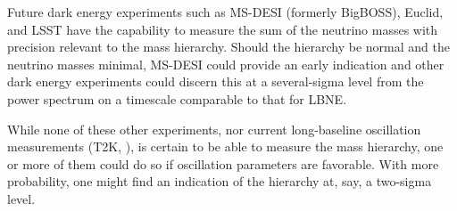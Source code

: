Future dark energy experiments such as MS-DESI (formerly BigBOSS),
Euclid, and LSST have the capability to measure the sum of the neutrino masses with precision relevant to the mass hierarchy.  Should the hierarchy be normal and the neutrino masses minimal, MS-DESI could provide an early indication and other dark energy experiments could discern this at a several-sigma level from the power spectrum on a timescale comparable to that for LBNE.

While none of these other experiments, nor current long-baseline oscillation measurements (T2K, \NOvA), is certain to be able to measure the mass hierarchy, one or more of them could do so if oscillation parameters are
 favorable.  With more probability, one might find an indication of the hierarchy at, say, a two-sigma level.   

